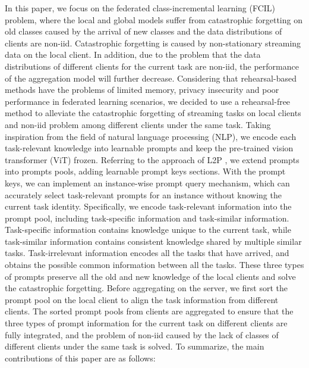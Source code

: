 \documentclass[sigconf,anonymous,review,screen]{acmart}
\begin{document}
In this paper, we focus on the federated class-incremental learning (FCIL) problem, where the local and global models suffer from catastrophic forgetting on old classes caused by the arrival of new classes and the data distributions of clients are non-iid. Catastrophic forgetting \cite{mccloskey1989catastrophic} is caused by non-stationary streaming data on the local client. In addition, due to the problem that the data distributions of different clients for the current task are non-iid, the performance of the aggregation model will further decrease. Considering that rehearsal-based methods have the problems of limited memory, privacy insecurity and poor performance in federated learning scenarios, we decided to use a rehearsal-free method to alleviate the catastrophic forgetting of streaming tasks on local clients and non-iid problem among different clients under the same task. Taking inspiration from the field of natural language processing (NLP), we encode each task-relevant knowledge into learnable prompts \cite{lester2021power,li2021prefix,wang2022learning} and keep the pre-trained vision transformer (ViT) \cite{dosovitskiyimage} frozen. Referring to the approach of L2P \cite{wang2022learning}, we extend prompts into prompts pools, adding learnable prompt keys sections. With the prompt keys, we can implement an instance-wise prompt query mechanism, which can accurately select task-relevant prompts for an instance without knowing the current task identity. Specifically, we encode task-relevant information into the prompt pool, including task-specific information and task-similar information. Task-specific information contains knowledge unique to the current task, while task-similar information contains consistent knowledge shared by multiple similar tasks. Task-irrelevant information encodes all the tasks that have arrived, and obtains the possible common information between all the tasks. These three types of prompts preserve all the old and new knowledge of the local clients and solve the catastrophic forgetting. Before aggregating on the server, we first sort the prompt pool on the local client to align the task information from different clients. The sorted prompt pools from clients are aggregated to ensure that the three types of prompt information for the current task on different clients are fully integrated, and the problem of non-iid caused by the lack of classes of different clients under the same task is solved. To summarize, the main contributions of this paper are as follows:
\end{document}
